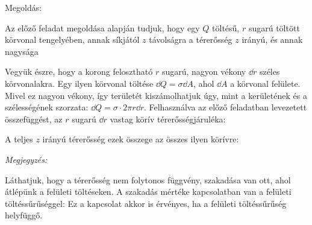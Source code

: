  
\ifdefined\megoldas

 Megoldás: 

 Az előző feladat megoldása alapján tudjuk, hogy egy $Q$ töltésű, $r$ sugarú töltött körvonal tengelyében, annak síkjától $z$ távolságra a térerősség $z$ irányú, és annak nagysága

 Vegyük észre, hogy a korong felosztható $r$ sugarú, nagyon vékony $\dd r$ széles körvonalakra. Egy ilyen körvonal töltése $\dd Q=\sigma \dd A$, ahol $\dd A$ a körvonal felülete. Mivel ez nagyon vékony, így területét kiszámolhatjuk úgy, mint a kerületének és a szélességének szorzata: $\dd Q=\sigma\cdot 2 \pi r \dd r$. Felhasználva az előző feladatban levezetett összefüggést, az $r$ sugarú $\dd r$ vastag körív térerősségjáruléka:

 A teljes $z$ irányú térerősség ezek összege az összes ilyen körívre:
 
 \emph{Megjegyzés:}
 
 Láthatjuk, hogy a térerősség nem folytonos függvény, szakadása van ott, ahol átlépünk a felületi töltéseken. A szakadás mértéke kapcsolatban van a felületi töltéssűrűséggel:
 Ez a kapcsolat akkor is érvényes, ha a felületi töltéssűrűség helyfüggő.
 
\fi